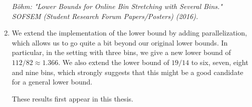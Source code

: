 \begin{enumerate}
\noindent\textit{Böhm: "Lower Bounds for Online Bin Stretching with
Several Bins." SOFSEM (Student Research Forum Papers/Posters) (2016).}

\item We extend the implementation of the lower bound by adding
parallelization, which allows us to go quite a bit beyond our original
lower bounds. In particular, in the setting with three bins, we give a
new lower bound of $112/82 \approx 1.366$. We also extend the lower
bound of $19/14$ to six, seven, eight and nine bins, which strongly
suggests that this might be a good candidate for a general lower
bound.

These results first appear in this thesis.

\end{enumerate}